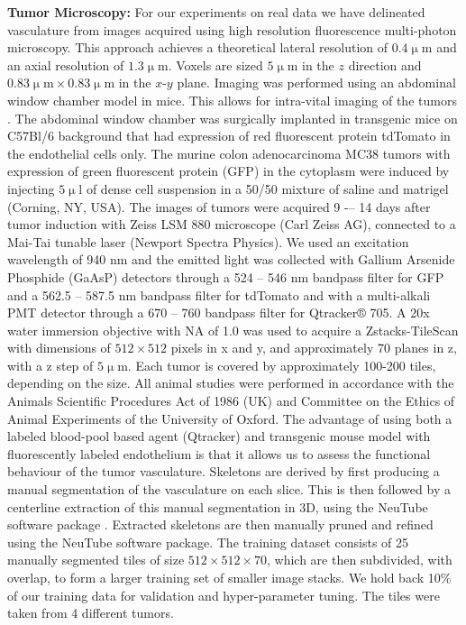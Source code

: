 \documentclass[journal,transmag]{IEEEtran}
\begin{document}
\textbf{Tumor Microscopy:} For our experiments on real data we have delineated vasculature from images acquired using high resolution fluorescence multi-photon microscopy. This approach achieves a theoretical lateral resolution of $0.4\upmu\mbox{m}$ and an axial resolution of $1.3\upmu\mbox{m}$. Voxels are sized $5\upmu\mbox{m}$ in the $z$ direction and $0.83 \upmu\mbox{m} \times 0.83 \upmu\mbox{m}$ in the $x$-$y$ plane. Imaging was performed using an abdominal window chamber model in mice. This allows for intra-vital imaging of the tumors \cite{Ritsma2013}. The abdominal window chamber was surgically implanted in transgenic mice on C57Bl/6 background that had expression of red fluorescent protein tdTomato in the endothelial cells only. The murine colon adenocarcinoma MC38 tumors with expression of green fluorescent protein (GFP) in the cytoplasm were induced by injecting $5\upmu\mbox{l}$ of dense cell suspension in a 50/50 mixture of saline and matrigel (Corning, NY, USA). The images of tumors were acquired 9 -– 14 days after tumor induction with Zeiss LSM 880 microscope (Carl Zeiss AG), connected to a Mai-Tai tunable laser (Newport Spectra Physics). We used an excitation wavelength of 940 nm and the emitted light was collected with Gallium Arsenide Phosphide (GaAsP) detectors through a 524 -- 546 nm bandpass filter for GFP and a 562.5 -- 587.5 nm bandpass filter for tdTomato and with a multi-alkali PMT detector through a 670 -- 760 bandpass filter for Qtracker® 705. A 20x water immersion objective with NA of 1.0 was used to acquire a Zstacks-TileScan with dimensions of $512 \times 512$ pixels in x and y, and approximately 70 planes in z, with a z step of $5\upmu\mbox{m}$. Each tumor is covered by approximately 100-200 tiles, depending on the size. All animal studies were performed in accordance with the Animals Scientific Procedures Act of 1986 (UK) and Committee on the Ethics of Animal Experiments of the University of Oxford.
The advantage of using both a labeled blood-pool based agent (Qtracker) and transgenic mouse model with fluorescently labeled endothelium is that it allows us to assess the functional behaviour of the tumor vasculature. Skeletons are derived by first producing a manual segmentation of the vasculature on each slice. This is then followed by a centerline extraction of this manual segmentation in 3D, using the NeuTube software package \cite{Feng2015}. Extracted skeletons are then manually pruned and refined using the NeuTube software package. The training dataset consists of 25 manually segmented tiles of size $512 \times 512 \times 70$, which are then subdivided, with overlap, to form a larger training set of smaller image stacks. We hold back 10\% of our training data for validation and hyper-parameter tuning. The tiles were taken from 4 different tumors.
\end{document}
